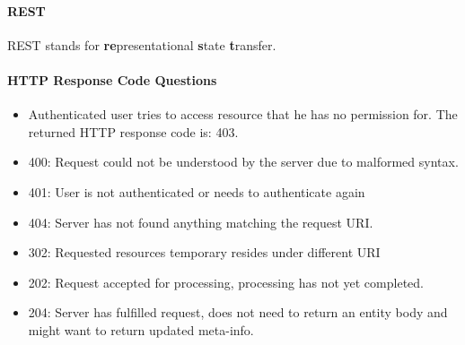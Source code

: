 \paragraph{REST}
REST stands for \textbf{re}presentational \textbf{s}tate \textbf{t}ransfer.

\paragraph{HTTP Response Code Questions}
\begin{itemize}
    \item Authenticated user tries to access resource that he has no permission for. The returned HTTP response code is: 403.
    \item 400: Request could not be understood by the server due to malformed syntax.
    \item 401: User is not authenticated or needs to authenticate again
    \item 404: Server has not found anything matching the request URI.
    \item 302: Requested resources temporary resides under different URI
    \item 202: Request accepted for processing, processing has not yet completed.
    \item 204: Server has fulfilled request, does not need to return an entity body and might want to return updated meta-info. 
\end{itemize}

